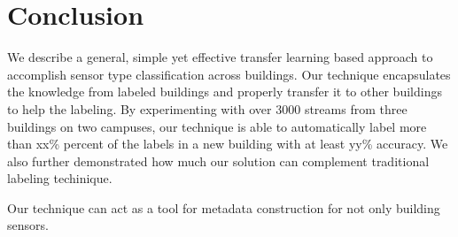 \section{Conclusion}
We describe a general, simple yet effective transfer learning based approach to accomplish sensor type classification across buildings.
Our technique encapsulates the knowledge from labeled buildings and properly transfer it to other buildings to help the labeling.
By experimenting with over 3000 streams from three buildings on two campuses, our technique is able to automatically label more than xx\% percent of the labels in a new building with at least yy\% accuracy.
We also further demonstrated how much our solution can complement traditional labeling techinique.

Our technique can act as a tool for metadata construction for not only building sensors. 

